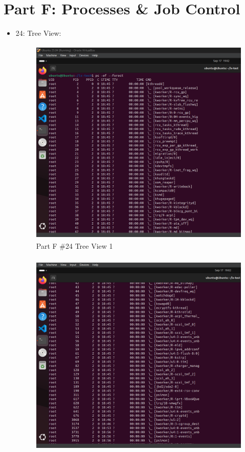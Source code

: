 \section{Part F: Processes \& Job Control}
\begin{itemize}
    \item 24: Tree View:
    \begin{figure}[H]
        \centering
        \includegraphics[width=15cm, height=10cm]{png/LinuxProblemSetPicsPNG/TreeView1.png}
        \caption{Part F \#24 Tree View 1}
        \label{fig:partF 24 Tree 1}
    \end{figure}
    \begin{figure}[H]
        \centering
        \includegraphics[width=15cm, height=10cm]{png/LinuxProblemSetPicsPNG/TreeView2.png}

\end{figure}
\end{itemize}
